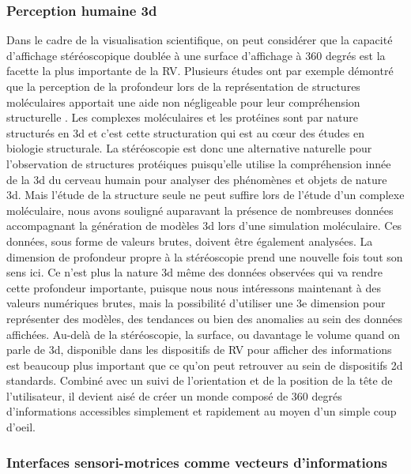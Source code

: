 \subsubsection{Perception humaine 3d}

Dans le cadre de la visualisation scientifique, on peut considérer que la capacité d'affichage stéréoscopique doublée à une surface d'affichage à 360 degrés est la facette la plus importante de la RV. Plusieurs études ont par exemple démontré que la perception de la profondeur lors de la représentation de structures moléculaires apportait une aide non négligeable pour leur compréhension structurelle \cite{van_dam_immersive_2000,stone_immersive_2010,odonoghue_visualization_2010}. Les complexes moléculaires et les protéines sont par nature structurés en 3d et c'est cette structuration qui est au cœur des études en biologie structurale. La stéréoscopie est donc une alternative naturelle pour l'observation de structures protéiques puisqu'elle utilise la compréhension innée de la 3d du cerveau humain pour analyser des phénomènes et objets de nature 3d. 
Mais l'étude de la structure seule ne peut suffire lors de l'étude d'un complexe moléculaire, nous avons souligné auparavant la présence de nombreuses données accompagnant la génération de modèles 3d lors d'une simulation moléculaire. Ces données, sous forme de valeurs brutes, doivent être également analysées. La dimension de profondeur propre à la stéréoscopie prend une nouvelle fois tout son sens ici. Ce n'est plus la nature 3d même des données observées qui va rendre cette profondeur importante, puisque nous nous intéressons maintenant à des valeurs numériques brutes, mais la possibilité d'utiliser une 3e dimension pour représenter des modèles, des tendances ou bien des anomalies au sein des données affichées.
Au-delà de la stéréoscopie, la surface, ou davantage le volume quand on parle de 3d, disponible dans les dispositifs de RV pour afficher des informations est beaucoup plus important que ce qu'on peut retrouver au sein de dispositifs 2d standards. Combiné avec un suivi de l'orientation et de la position de la tête de l'utilisateur, il devient aisé de créer un monde composé de 360 degrés d'informations accessibles simplement et rapidement au moyen d'un simple coup d'oeil.

\subsubsection{Interfaces sensori-motrices comme vecteurs d'informations}

